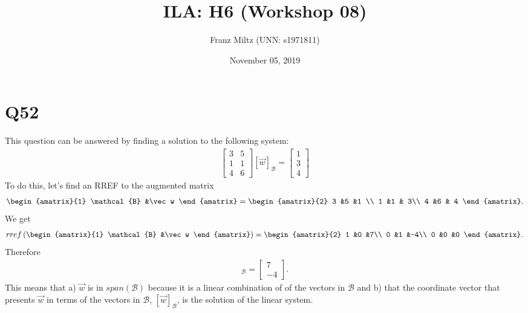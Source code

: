 \documentclass{article}
\title{ILA: H6 (Workshop 08)}
\author{Franz Miltz (UNN: s1971811)}
\date{November 05, 2019}
\begin{document}
\maketitle
\section*{Q52}
This question can be answered by finding a solution to the following system:
\begin{align*}
    \begin{bmatrix}
        3 &5\\ 1 & 1\\ 4 &6
    \end{bmatrix}
    [\vec w]_{\mathcal{B}} =
    \begin{bmatrix}
        1 \\ 3 \\4
    \end{bmatrix}
\end{align*}
To do this, let's find an RREF to the augmented matrix
\begin{align*}
    \begin{amatrix}{1}
        \mathcal{B} &\vec w
    \end{amatrix} = 
    \begin{amatrix}{2}
        3 &5 &1 \\
        1 &1 & 3\\
        4 &6 & 4
    \end{amatrix}.
\end{align*}
We get
\begin{align*}
    rref\left(
    \begin{amatrix}{1}
        \mathcal{B} &\vec w
    \end{amatrix}\right)= 
    \begin{amatrix}{2}
        1 &0 &7\\
        0 &1 &-4\\
        0 &0 &0
    \end{amatrix}.
\end{align*}
Therefore
\begin{align*}
    [\vec w]_\mathcal{B} = \begin{bmatrix}
        7\\ -4
    \end{bmatrix}.
\end{align*}
This means that a) $\vec w$ is in $span(\mathcal{B})$ because it is a linear combination of of the vectors in $\mathcal{B}$ and b) that the coordinate vector that presents $\vec w$ in terms of the vectors in $\mathcal{B}$, $[\vec w]_\mathcal{B}$, is the solution of the linear system.
\end{document}
